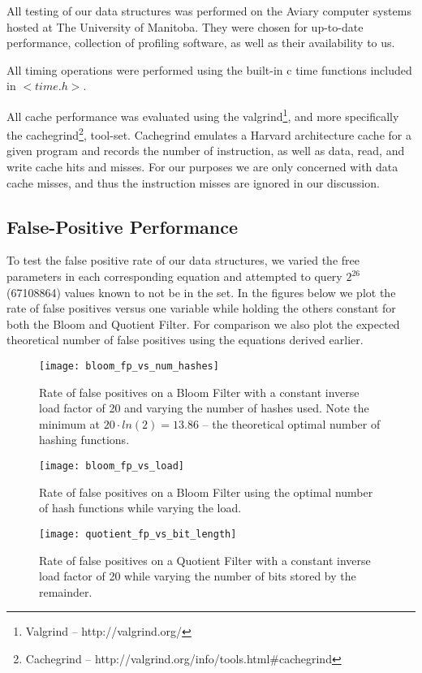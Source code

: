 \documentclass[twoside]{article}
\begin{document}
All testing of our data structures was performed on the Aviary computer systems hosted at The University of Manitoba. They were chosen for up-to-date performance, collection of profiling software, as well as their availability to us.

All timing operations were performed using the built-in c time functions included in $<time.h>$.

All cache performance was evaluated using the valgrind\footnote{Valgrind -- http://valgrind.org/}, and more specifically the cachegrind\footnote{Cachegrind -- http://valgrind.org/info/tools.html\#cachegrind}, tool-set. Cachegrind emulates a Harvard architecture cache for a given program and records the number of instruction, as well as data, read, and write cache hits and misses. For our purposes we are only concerned with data cache misses, and thus the instruction misses are ignored in our discussion.

\subsection{False-Positive Performance}

To test the false positive rate of our data structures, we varied the free parameters in each corresponding equation and attempted to query $2^{26}$ (67108864) values known to not be in the set. In the figures below we plot the rate of false positives versus one variable while holding the others constant for both the Bloom and Quotient Filter. For comparison we also plot the expected theoretical number of false positives using the equations derived earlier.
\begin{figure}[!htb]
\centering
	\texttt{[image: bloom\_fp\_vs\_num\_hashes]}
	\caption{Rate of false positives on a Bloom Filter with a constant inverse load factor of 20 and varying the number of hashes used. Note the minimum at $20\cdot ln(2) = 13.86$ -- the theoretical optimal number of hashing functions.}
\end{figure}

\begin{figure}[!htb]
\centering
	\texttt{[image: bloom\_fp\_vs\_load]}
	\caption{Rate of false positives on a Bloom Filter using the optimal number of hash functions while varying the load.}
\end{figure}

\begin{figure}[!htb]
\centering
	\texttt{[image: quotient\_fp\_vs\_bit\_length]}
	\caption{Rate of false positives on a Quotient Filter with a constant inverse load factor of 20 while varying the number of bits stored by the remainder.}
\end{figure}
\end{document}
